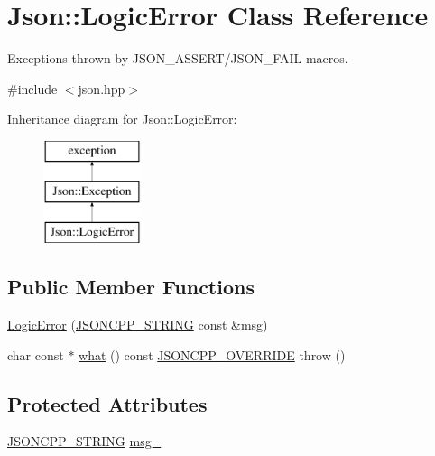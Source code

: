 \hypertarget{classJson_1_1LogicError}{}\section{Json\+:\+:Logic\+Error Class Reference}
\label{classJson_1_1LogicError}


Exceptions thrown by J\+S\+O\+N\+\_\+\+A\+S\+S\+E\+R\+T/\+J\+S\+O\+N\+\_\+\+F\+A\+IL macros.  




{\ttfamily \#include $<$json.\+hpp$>$}

Inheritance diagram for Json\+:\+:Logic\+Error\+:\begin{figure}[H]
\begin{center}
\leavevmode
\includegraphics[height=3.000000cm]{classJson_1_1LogicError}
\end{center}
\end{figure}
\subsection*{Public Member Functions}
\begin{DoxyCompactItemize}
\item 
\hyperlink{classJson_1_1LogicError_acca679aa49768a4a1de7b705c67c2919}{Logic\+Error} (\hyperlink{json_8hpp_a1e723f95759de062585bc4a8fd3fa4be}{J\+S\+O\+N\+C\+P\+P\+\_\+\+S\+T\+R\+I\+NG} const \&msg)
\item 
char const $\ast$ \hyperlink{classJson_1_1Exception_a5a9ed7d91b828b9be81706ef9d483ed6}{what} () const \hyperlink{json_8hpp_a824d6199c91488107e443226fa6022c5}{J\+S\+O\+N\+C\+P\+P\+\_\+\+O\+V\+E\+R\+R\+I\+DE}  throw ()
\end{DoxyCompactItemize}
\subsection*{Protected Attributes}
\begin{DoxyCompactItemize}
\item 
\hyperlink{json_8hpp_a1e723f95759de062585bc4a8fd3fa4be}{J\+S\+O\+N\+C\+P\+P\+\_\+\+S\+T\+R\+I\+NG} \hyperlink{classJson_1_1Exception_aae3cbb8b45bf21480f64502a8329659f}{msg\+\_\+}
\end{DoxyCompactItemize}


